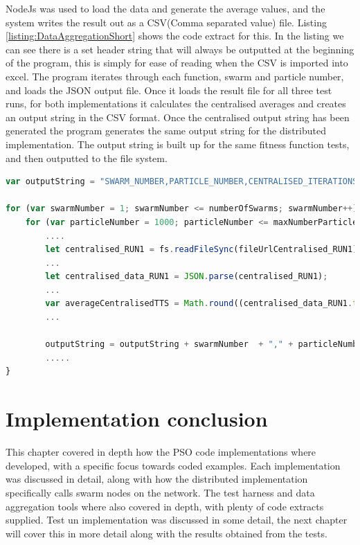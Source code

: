 \documentclass[oneside,12pt]{book}
\begin{document}
NodeJs was used to load the data and generate the average values, and the system writes the result out as a CSV(Comma separated value) file. Listing \ref{listing:DataAggregationShort} shows the code extract for this. In the listing we can see there is a set header string that will always be outputted at the beginning of the program, this is simply for ease of reading when the CSV is imported into excel. The program iterates through each function, swarm and particle number, and loads the JSON output file. Once it loads the result file for all three test runs, for both implementations it calculates the centralised averages and creates an output string in the CSV format. Once the centralised output string has been generated the program generates the same output string for the distributed implementation. The output string is built up for the same fitness function tests, and then outputted to the file system. 

\begin{lstlisting}[basicstyle=\footnotesize, language=JavaScript]
var outputString = "SWARM_NUMBER,PARTICLE_NUMBER,CENTRALISED_ITERATIONS,CENTRALISED_TIME_TO_SOLUTION,CENTRALISED_FINAL_GROUP_BEST,DISTRIBUTED_ITERATIONS,DISTRIBUTED_TIME_TO_SOLUTION,DISTRIBUTED_FINAL_GROUP_BEST\n";

for (var swarmNumber = 1; swarmNumber <= numberOfSwarms; swarmNumber++) {
    for (var particleNumber = 1000; particleNumber <= maxNumberParticles; particleNumber += particleIncrement) {
        ....
        let centralised_RUN1 = fs.readFileSync(fileUrlCentralised_RUN1);
        ...
        let centralised_data_RUN1 = JSON.parse(centralised_RUN1);
        ...
        var averageCentralisedTTS = Math.round((centralised_data_RUN1.timeToSolution + centralised_data_RUN2.timeToSolution + centralised_data_RUN3.timeToSolution)/3);
        ...

        outputString = outputString + swarmNumber  + "," + particleNumber + "," + averageCentralisedIterations + "," + averageCentralisedTTS + "," + averageCentralisedGbest + ",";
        .....
}
\end{lstlisting}
\label{listing:DataAggregationShort}

\section{Implementation conclusion}
This chapter covered in depth how the PSO code implementations where developed, with a specific focus towards coded examples. Each implementation was discussed in detail, along with how the distributed implementation specifically calls swarm nodes on the network. The test harness and data aggregation tools where also covered in depth, with plenty of code extracts supplied. Test un implementation was discussed in some detail, the next chapter will cover this in more detail along with the results obtained from the tests.
\end{document}
